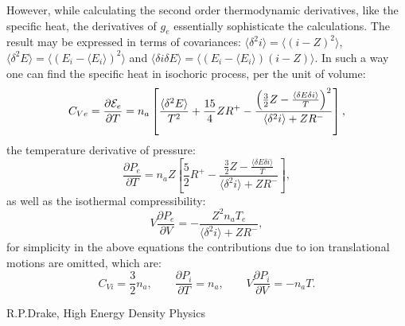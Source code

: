 \documentclass[english,12pt]{revtex4}
\begin{document}
However, while calculating the second order thermodynamic derivatives, like the specific heat, the derivatives of $g_e$ essentially sophisticate the 
calculations. The result may be expressed in terms of covariances: $\langle\delta^2i\rangle=\langle(i-Z)^2\rangle$, $\langle\delta^2E\rangle=\langle(E_i-\langle E_i\rangle)^2 \rangle$ and 
$\langle\delta i\delta E\rangle=\langle(E_i-\langle E_i\rangle)(i-Z)\rangle$. In such a way one can find the specific heat in isochoric process, per the unit of volume:
\begin{equation}
C_{Ve}=\frac{\partial {\cal E}_e}{\partial T}=n_a\left[\frac{\langle\delta^2E\rangle}{T^2}+\frac{15}4ZR^+
-\frac{\left(\frac32Z-\frac{\langle\delta E\delta i\rangle}T\right)^2}{\langle\delta^2i\rangle+ZR^-}\right],
\end{equation}
the temperature derivative of pressure:
\begin{equation}
\frac {\partial P_e}{\partial T}=n_aZ\left[\frac52 R^+ -\frac{\frac32Z-\frac{\langle\delta E\delta i\rangle}T}{\langle\delta^2i\rangle+ZR^-}\right],
\end{equation}
as well as the isothermal compressibility:
\begin{equation}
V\frac{\partial P_e}{\partial V}=-\frac{Z^2n_aT_e}{\langle\delta^2i\rangle+ZR^-},
\end{equation}
for simplicity in the above equations the contributions due to ion translational motions are omitted, which are:
\begin{equation}
C_{Vi}=\frac32n_a, \qquad
\frac{\partial P_i}{\partial T}=n_a, \qquad
V\frac{\partial P_i}{\partial V}=-n_aT.
\end{equation}

%
%





\begin{thebibliography}{99}
R.P.Drake, High Energy Density Physics
\end{thebibliography}
\end{document}
